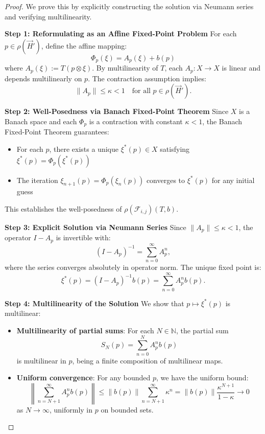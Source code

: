 \documentclass[11pt]{article}
\begin{document}
\begin{proof}
We prove this by explicitly constructing the solution via Neumann series and verifying multilinearity.

\noindent\textbf{Step 1: Reformulating as an Affine Fixed-Point Problem}
For each \( p \in \rho(\vec{H}') \), define the affine mapping:
\[
\Phi_p(\xi) = A_p(\xi) + b(p)
\]
where \( A_p(\xi) := T(p \otimes \xi) \). By multilinearity of \( T \), each \( A_p: X \to X \) is linear and depends multilinearly on \( p \). The contraction assumption implies:
\[
\|A_p\| \le \kappa < 1 \quad \text{for all } p \in \rho(\vec{H}').
\]

\noindent\textbf{Step 2: Well-Posedness via Banach Fixed-Point Theorem}
Since \( X \) is a Banach space and each \( \Phi_p \) is a contraction with constant \( \kappa < 1 \), the Banach Fixed-Point Theorem guarantees:
\begin{itemize}
    \item For each \( p \), there exists a unique \( \xi^*(p) \in X \) satisfying \( \xi^*(p) = \Phi_p(\xi^*(p)) \)
    \item The iteration \( \xi_{n+1}(p) = \Phi_p(\xi_n(p)) \) converges to \( \xi^*(p) \) for any initial guess
\end{itemize}
This establishes the well-posedness of \( \rho(\mathcal{F}_{i,j})(T,b) \).

\noindent\textbf{Step 3: Explicit Solution via Neumann Series}
Since \( \|A_p\| \le \kappa < 1 \), the operator \( I - A_p \) is invertible with:
\[
(I - A_p)^{-1} = \sum_{n=0}^\infty A_p^n,
\]
where the series converges absolutely in operator norm. The unique fixed point is:
\[
\xi^*(p) = (I - A_p)^{-1} b(p) = \sum_{n=0}^\infty A_p^n b(p).
\]

\noindent\textbf{Step 4: Multilinearity of the Solution}
We show that \( p \mapsto \xi^*(p) \) is multilinear:

\begin{itemize}
    \item \textbf{Multilinearity of partial sums}: For each \( N \in \mathbb{N} \), the partial sum
    \[
    S_N(p) = \sum_{n=0}^N A_p^n b(p)
    \]
    is multilinear in \( p \), being a finite composition of multilinear maps.
    
    \item \textbf{Uniform convergence}: For any bounded \( p \), we have the uniform bound:
    \[
    \left\| \sum_{n=N+1}^\infty A_p^n b(p) \right\| \le \|b(p)\| \sum_{n=N+1}^\infty \kappa^n = \|b(p)\| \frac{\kappa^{N+1}}{1-\kappa} \to 0
    \]
    as \( N \to \infty \), uniformly in \( p \) on bounded sets.
    

\end{itemize}
\end{proof}
\end{document}
